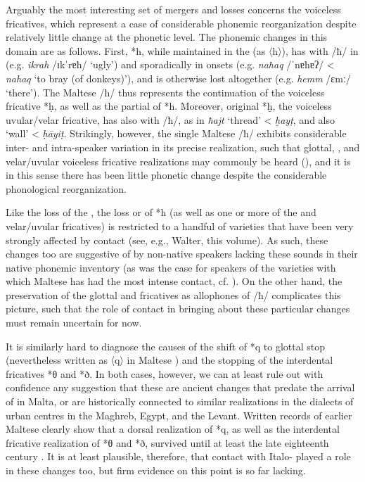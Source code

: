 \documentclass[output=paper]{langsci/langscibook}
\begin{document}
Arguably the most interesting set of mergers and losses concerns the voiceless fricatives, which represent a case of considerable phonemic reorganization despite relatively little change at the phonetic level. The phonemic changes in this domain are as follows. First, *h, while maintained in the  (as 〈h〉), has  with /ħ/ in  (e.g. \textit{ikrah} /ɪkˈrɐħ/ `ugly') and sporadically in onsets (e.g. \textit{naħaq} /ˈnɐħɐʔ/ < \textit{nahaq} `to bray (of donkeys)'), and is otherwise lost altogether (e.g. \textit{hemm} /ɛmː/ `there'). The Maltese  /ħ/ thus represents the continuation of the voiceless  fricative *\d{h}, as well as the partial  of *h. Moreover, original *ḫ, the voiceless uvular/velar fricative, has also  with /ħ/, as in \textit{ħajt} `thread' < \textit{ḫay\d{t}}, and also `wall' < \textit{\d{h}\={a}yi\d{t}}. Strikingly, however, the single Maltese  /ħ/ exhibits considerable inter- and intra-speaker variation in its precise realization, such that glottal, , and velar/uvular voiceless fricative realizations may commonly be heard (\citealt[301]{BorgAzzopardi-Alexander1997}), and it is in this sense there has been little phonetic change despite the considerable phonological reorganization.

Like the loss of the , the loss or  of *h (as well as one or more of the  and velar/uvular fricatives) is restricted to a handful of  varieties that have been very strongly affected by contact (see, e.g., Walter, this volume). As such, these changes too are suggestive of  by non-native speakers lacking these sounds in their native phonemic inventory (as was the case for speakers of the  varieties with which Maltese has had the most intense contact, cf. \citealt[141--142] {Loporcaro2011}). On the other hand, the preservation of the glottal and  fricatives as allophones of /ħ/ complicates this picture, such that the role of contact in bringing about these particular changes must remain uncertain for now.

It is similarly hard to diagnose the causes of the shift of *q to glottal stop (nevertheless written as 〈q〉 in Maltese ) and the stopping of the interdental fricatives *θ and *ð. In both cases, however, we can at least rule out with confidence any suggestion that these are ancient changes that predate the arrival of  in Malta, or are historically connected to similar realizations in the  dialects of urban centres in the Maghreb, Egypt, and the Levant. Written records of earlier Maltese clearly show that a dorsal realization of *q, as well as the interdental fricative realization of *θ and *ð, survived until at least the late eighteenth century \citep{Avram2012,Avram2014Maltese}. It is at least plausible, therefore, that contact with Italo- played a role in these changes too, but firm evidence on this point is so far lacking.
\end{document}
